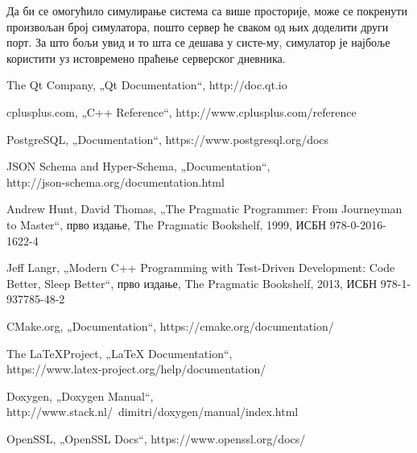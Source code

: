 \documentclass[a4paper, 12pt, diplomski]{etfcyr}
\def\quote#1{„#1“}
\begin{document}
\begin{justify}
				Да би се омогућило симулирање система са више просторије, може се покренути произвољан број симулатора, пошто сервер ће сваком од њих доделити други порт. За што бољи увид и то шта се дешава у систе-му, симулатор је најбоље користити уз истовремено праћење серверског дневника.

			\end{justify}

	\begin{thebibliography}{9}
		The Qt Company, \quote{Qt Documentation},
		http://doc.qt.io

		cplusplus.com, \quote{C++ Reference},
		http://www.cplusplus.com/reference

		PostgreSQL, \quote{Documentation},
		https://www.postgresql.org/docs

		JSON Schema and Hyper-Schema, \quote{Documentation},\\
		http://json-schema.org/documentation.html

		Andrew Hunt, David Thomas, \quote{The Pragmatic Programmer: From Journeyman to Master},
		прво издање, The Pragmatic Bookshelf, 1999, ИСБН 978-0-2016-1622-4

		Jeff Langr, \quote{Modern C++ Programming with Test-Driven Development: Code Better, Sleep Better},
		прво издање, The Pragmatic Bookshelf, 2013, ИСБН 978-1-937785-48-2

		CMake.org, \quote{Documentation},
		https://cmake.org/documentation/

		The \LaTeX Project, \quote{LaTeX Documentation},\\
		https://www.latex-project.org/help/documentation/

		Doxygen, \quote{Doxygen Manual},
		http://www.stack.nl/~dimitri/doxygen/manual/index.html

		OpenSSL, \quote{OpenSSL Docs},
		https://www.openssl.org/docs/
	\end{thebibliography}
\end{document}
